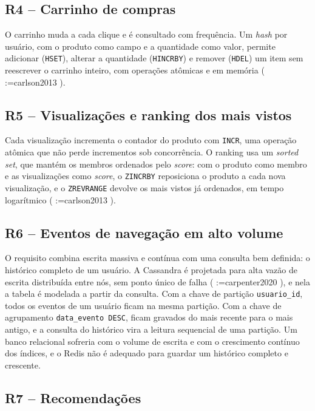 \documentclass[12pt,a4paper,oneside]{article}
\makeatletter
\newcommand{\tys@getpar}[1]{%
  \@ifundefined{cite@#1}{\textbf{??#1??}}{\@nameuse{cite@#1}}%
}
\newif\iftysfirst
\newcommand{\tys@listpar}[1]{%
  \tysfirsttrue
  \@for\tys@key:=#1\do{%
    \iftysfirst\tysfirstfalse\else; \fi
    \expandafter\tys@getpar\expandafter{\tys@key}%
  }%
}
\renewcommand{\cite}[1]{(\tys@listpar{#1})}
\makeatother
\begin{document}
\subsection{R4 -- Carrinho de compras}

O carrinho muda a cada clique e é consultado com frequência. Um \textit{hash} por usuário, com o produto como campo e a quantidade como valor, permite adicionar (\texttt{HSET}), alterar a quantidade (\texttt{HINCRBY}) e remover (\texttt{HDEL}) um item sem reescrever o carrinho inteiro, com operações atômicas e em memória \cite{carlson2013}.

\subsection{R5 -- Visualizações e ranking dos mais vistos}

Cada visualização incrementa o contador do produto com \texttt{INCR}, uma operação atômica que não perde incrementos sob concorrência. O ranking usa um \textit{sorted set}, que mantém os membros ordenados pelo \textit{score}: com o produto como membro e as visualizações como \textit{score}, o \texttt{ZINCRBY} reposiciona o produto a cada nova visualização, e o \texttt{ZREVRANGE} devolve os mais vistos já ordenados, em tempo logarítmico \cite{carlson2013}.

\subsection{R6 -- Eventos de navegação em alto volume}

O requisito combina escrita massiva e contínua com uma consulta bem definida: o histórico completo de um usuário. A Cassandra é projetada para alta vazão de escrita distribuída entre nós, sem ponto único de falha \cite{carpenter2020}, e nela a tabela é modelada a partir da consulta. Com a chave de partição \texttt{usuario\_id}, todos os eventos de um usuário ficam na mesma partição. Com a chave de agrupamento \texttt{data\_evento DESC}, ficam gravados do mais recente para o mais antigo, e a consulta do histórico vira a leitura sequencial de uma partição. Um banco relacional sofreria com o volume de escrita e com o crescimento contínuo dos índices, e o Redis não é adequado para guardar um histórico completo e crescente.

\subsection{R7 -- Recomendações}
\end{document}
